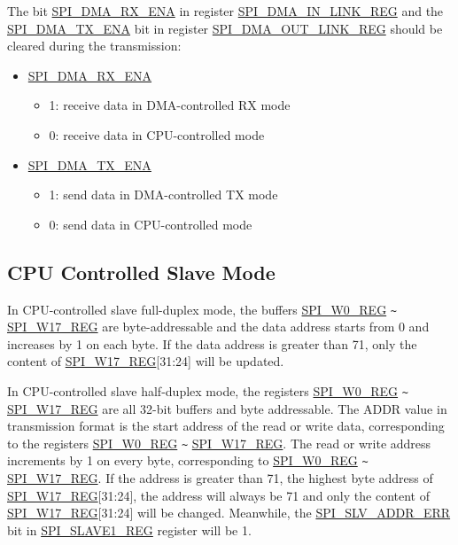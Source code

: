 \documentclass[main\_\_EN.tex]{subfiles}
\begin{document}
The bit \hyperref[fielddesc:SPIDMARXENA]{SPI\_DMA\_RX\_ENA} in register \hyperref[regdesc:SPIDMAINLINKREG]{SPI\_DMA\_IN\_LINK\_REG} and the \hyperref[fielddesc:SPIDMATXENA]{SPI\_DMA\_TX\_ENA} bit in register \hyperref[regdesc:SPIDMAOUTLINKREG]{SPI\_DMA\_OUT\_LINK\_REG} should be cleared during the transmission:
\begin{itemize}
    \item \hyperref[fielddesc:SPIDMARXENA]{SPI\_DMA\_RX\_ENA}
    \begin{itemize}
        \item 1: receive data in DMA-controlled RX mode
        \item 0: receive data in CPU-controlled mode
    \end{itemize}
    \item \hyperref[fielddesc:SPIDMATXENA]{SPI\_DMA\_TX\_ENA}
    \begin{itemize}
        \item 1: send data in DMA-controlled TX mode
        \item 0: send data in CPU-controlled mode
    \end{itemize}
\end{itemize}


\subsection{CPU Controlled Slave Mode} \label{GP-SPI2 slave CPU}

In CPU-controlled slave full-duplex mode, the buffers \hyperref[regdesc:SPIW0REG]{SPI\_W0\_REG} \verb+~+ \hyperref[regdesc:SPIW17REG]{SPI\_W17\_REG} are byte-addressable and the data address starts from 0 and increases by 1 on each byte. If the data address is greater than 71, only the content of \hyperref[regdesc:SPIW17REG]{SPI\_W17\_REG}[31:24] will be updated.

In CPU-controlled slave half-duplex mode, the registers \hyperref[regdesc:SPIW0REG]{SPI\_W0\_REG} \verb+~+ \hyperref[regdesc:SPIW17REG]{SPI\_W17\_REG} are all 32-bit buffers and byte addressable. The ADDR value in transmission format is the start address of the read or write data, corresponding to the registers \hyperref[regdesc:SPIW0REG]{SPI\_W0\_REG}  \verb+~+ \hyperref[regdesc:SPIW17REG]{SPI\_W17\_REG}. The read or write address increments by 1 on every byte, corresponding to \hyperref[regdesc:SPIW0REG]{SPI\_W0\_REG}  \verb+~+ \hyperref[regdesc:SPIW17REG]{SPI\_W17\_REG}. If the address is greater than 71, the highest byte address of \hyperref[regdesc:SPIW17REG]{SPI\_W17\_REG}[31:24], the address will always be 71 and only the content of \hyperref[regdesc:SPIW17REG]{SPI\_W17\_REG}[31:24] will be changed. Meanwhile, the \hyperref[fielddesc:SPISLVADDRERR]{SPI\_SLV\_ADDR\_ERR} bit in \hyperref[regdesc:SPISLAVE1REG]{SPI\_SLAVE1\_REG} register will be 1.
\end{document}

